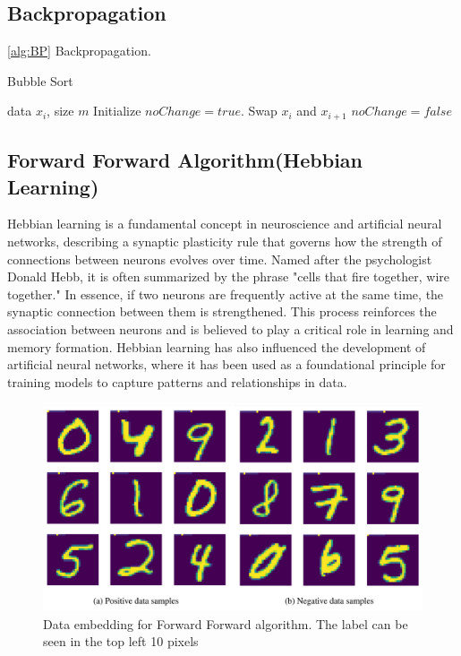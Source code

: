 \documentclass[nohyperref]{article}
\theoremstyle{plain}
\theoremstyle{definition}
\theoremstyle{remark}
\begin{document}
\subsection{Backpropagation}

\cref{alg:BP} Backpropagation.

\begin{algorithm}[tb]
   \caption{Bubble Sort}
   \label{alg:BP}
\begin{algorithmic}
    data $x_i$, size $m$
   \REPEAT
   \STATE Initialize $noChange = true$.
   \STATE Swap $x_i$ and $x_{i+1}$
   \STATE $noChange = false$
   \ENDIF
   \ENDFOR
\end{algorithmic}
\end{algorithm}



\subsection{Forward Forward Algorithm(Hebbian Learning)}
Hebbian learning is a fundamental concept in neuroscience and artificial neural networks, describing a synaptic plasticity rule that governs how the strength of connections between neurons evolves over time. Named after the psychologist Donald Hebb, it is often summarized by the phrase "cells that fire together, wire together." In essence, if two neurons are frequently active at the same time, the synaptic connection between them is strengthened. This process reinforces the association between neurons and is believed to play a critical role in learning and memory formation. Hebbian learning has also influenced the development of artificial neural networks, where it has been used as a foundational principle for training models to capture patterns and relationships in data.

\begin{figure}[ht]
\vskip 0.2in
\begin{center}
\centerline{\includegraphics[width=\columnwidth]{images/FF_embedding.png}}
\caption{Data embedding for Forward Forward algorithm. The label can be seen in the top left 10 pixels}
\end{center}
\vskip -0.2in
\end{figure}
\end{document}

